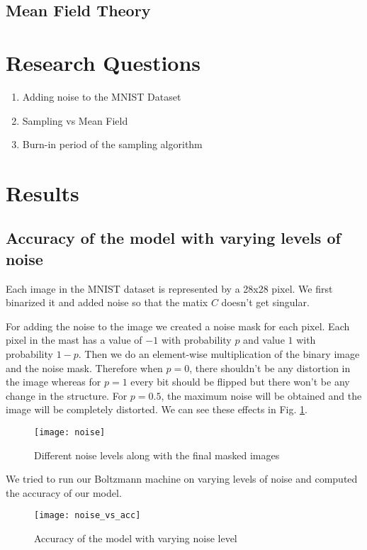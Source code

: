 \documentclass{article}
\begin{document}
\subsection*{Mean Field Theory}


\section*{Research Questions}
\begin{enumerate}
  \item Adding noise to the MNIST Dataset
  \item Sampling vs Mean Field
  \item Burn-in period of the sampling algorithm
\end{enumerate}

\section*{Results}

\subsection*{Accuracy of the model with varying levels of noise}
Each image in the MNIST dataset is represented by a 28x28 pixel. We first 
binarized it and added noise so that the matix $ C $ doesn't get singular.

For adding the noise to the image we created a noise mask for each pixel. Each
pixel in the mast has a value of $ -1 $ with probability $ p $ and value $ 1 $
with probability $ 1-p $. Then we do an element-wise multiplication of the 
binary image and the noise mask. Therefore when $ p=0 $, there shouldn't be any
distortion in the image whereas for $ p=1 $ every bit should be flipped but 
there won't be any change in the structure. For $ p=0.5 $, the maximum noise
will be obtained and the image will be completely distorted. We can see these
effects in Fig. \ref{fig:noise_level}.

\begin{figure}[h]
  \centering
  \texttt{[image: noise]}
  \caption{Different noise levels along with the final masked images}
  \label{fig:noise_level}
\end{figure}

We tried to run our Boltzmann machine on varying levels of noise and computed
the accuracy of our model.

\begin{figure}[h]
  \centering
  \texttt{[image: noise\_vs\_acc]}
  \caption{Accuracy of the model with varying noise level}
  \label{fig:noise_vs_acc}
\end{figure}
\end{document}
